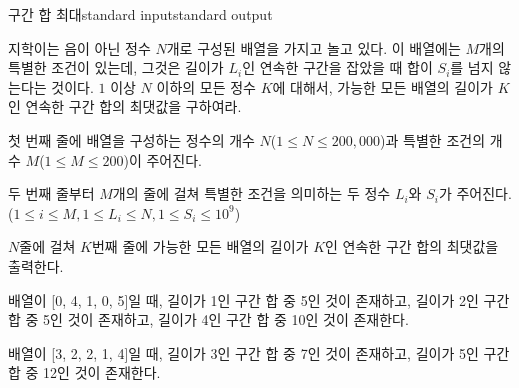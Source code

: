 \begin{problem}{구간 합 최대}{standard input}{standard output}

지학이는 음이 아닌 정수 $N$개로 구성된 배열을 가지고 놀고 있다. 이 배열에는 $M$개의 특별한 조건이 있는데, 그것은 길이가 $L_i$인 연속한 구간을 잡았을 때 합이 $S_i$를 넘지 않는다는 것이다. $1$ 이상 $N$ 이하의 모든 정수 $K$에 대해서, 가능한 모든 배열의 길이가 $K$인 연속한 구간 합의 최댓값을 구하여라.

\InputFile
첫 번째 줄에 배열을 구성하는 정수의 개수 $N$($1 \le N \le 200,000$)과 특별한 조건의 개수 $M$($1 \le M \le 200$)이 주어진다.

두 번째 줄부터 $M$개의 줄에 걸쳐 특별한 조건을 의미하는 두 정수 $L_i$와 $S_i$가 주어진다. ($1 \le i \le M, 1 \le L_i \le N, 1 \le S_i \le 10^9$)

\OutputFile
$N$줄에 걸쳐 $K$번째 줄에 가능한 모든 배열의 길이가 $K$인 연속한 구간 합의 최댓값을 출력한다.

\Example

\begin{example}
%
\end{example}

\Notes

배열이 [0, 4, 1, 0, 5]일 때, 길이가 1인 구간 합 중 5인 것이 존재하고, 길이가 2인 구간 합 중 5인 것이 존재하고, 길이가 4인 구간 합 중 10인 것이 존재한다.

배열이 [3, 2, 2, 1, 4]일 때, 길이가 3인 구간 합 중 7인 것이 존재하고, 길이가 5인 구간 합 중 12인 것이 존재한다.

\end{problem}
